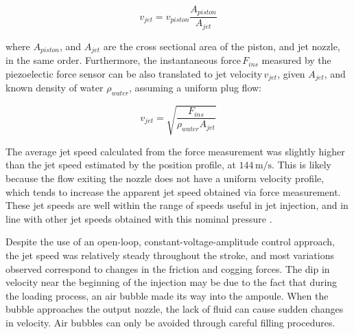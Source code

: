             \begin{equation}
            v_{jet}=v_{piston} \frac{A_{piston}}{A_{jet}}
            \label{eq:chap/validation/injection_test/v_jet estimated from area}
            \end{equation}
            
            where $A_{piston}$, and $A_{jet}$ are the cross sectional area of the piston, and jet nozzle, in the same order. Furthermore, the instantaneous force\,$F_{ins}$ measured by the piezoelectic force sensor can be also translated to jet velocity\,$v_{jet}$, given $A_{jet}$, and known density of water $\rho_{water}$, assuming a uniform plug flow: 
            
            \begin{equation}
            v_{jet}=\sqrt{\frac{F_{ins}}{\rho_{water}A_{jet}}}
            \label{eq:chap/validation/injection_test/v_jet estimated from force}
            \end{equation}
            
            The average jet speed calculated from the force measurement was slightly higher than the jet speed estimated by the position profile, at $144\,\mathrm{m/s}$. This is likely because the flow exiting the nozzle does not have a uniform velocity profile, which tends to increase the apparent jet speed obtained via force measurement. These jet speeds are well within the range of speeds useful in jet injection, and in line with other jet speeds obtained with this nominal pressure \cite{Williams2016}.


            Despite the use of an open-loop, constant-voltage-amplitude control approach, the jet speed was relatively steady throughout the stroke, and most variations observed correspond to changes in the friction and cogging forces. The dip in velocity near the beginning of the injection may be due to the fact that during the loading process, an air bubble made its way into the ampoule. When the bubble approaches the output nozzle, the lack of fluid can cause sudden changes in velocity. Air bubbles can only be avoided through careful filling procedures.
            
